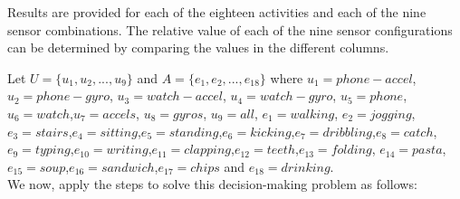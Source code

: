 \documentclass{IJFS}
\begin{document}
Results are provided for each of the eighteen activities and each of the nine sensor combinations.  The relative value of each of the nine sensor configurations can be determined by comparing the values in the different columns. 


Let $U=\{u_1, u_2,..., u_9\}$ and $A=\{e_1, e_2,...,e_{18}\}$ where $u_1=phone-accel$, $u_2=phone-gyro$, $u_3=watch-accel$, $u_4=watch-gyro$, $u_5=phone$,  $u_6=watch$,$u_7=accels$, $u_8=gyros$, $u_9=all$, $e_1=walking$, $e_2=jogging$,  $e_3=stairs$,$e_4=sitting$,$e_5=standing$,$e_6=kicking$,$e_7=dribbling$,$e_8=catch$,  $e_9=typing$,$e_{10}=writing$,$e_{11}=clapping$,$e_{12}=teeth$,$e_{13}=folding$,  $e_{14}= pasta$,$e_{15}=soup$,$e_{16}=sandwich$,$e_{17}=chips$ and $e_{18}=drinking$. \\

We now, apply the steps to solve this decision-making problem as follows:\\
\end{document}
